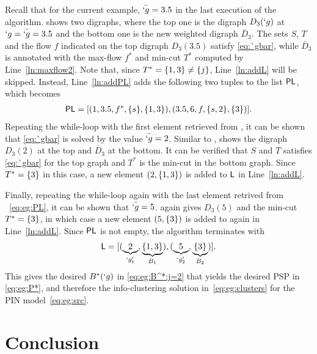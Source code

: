 \documentclass[conference,letterpaper]{IEEEtran}
\begin{document}
Recall that for the current example, $\bar {`g}=3.5$ in the last execution of the algorithm.
 shows two digraphs,
where the top one is the digraph $D_3(`g)$ at $`g=\bar{`g}=3.5$ and the bottom one is the new weighted digraph $\bar {D}_3$.
The sets $S$, $T$ and the flow $f$ indicated on the top
digraph $D_3(3.5)$ satisfy \eqref{eq:`gbar}, while $\bar {D}_3$ is annotated with the max-flow $f^*$
and min-cut $T^*$ computed by Line~\ref{ln:maxflow2}.  Note that, since $T^*=\{1,3\}\neq \{j\}$, Line~\ref{ln:addL} will be skipped. Instead, Line~\ref{ln:addPL} adds the following two tuples
to the list $\DataSty{PL}$, which becomes
\begin{align}
	\DataSty{PL}=[(1,3.5,f^*,\Set {s}, \Set {1,3}),(3.5,6,f,\Set {s,2}, \Set {3})]. \label{eq:eg:PL}
\end{align}
Repeating the while-loop with the first element retrieved from , it can be shown that \eqref{eq:`gbar} is solved by the value $\bar {`g}=2$. Similar to ,  shows the digraph $D_3(2)$ at the top and $\bar{D}_3$ at the bottom. It can be verified that $S$ and $T$ satisfies \eqref{eq:`gbar} for the top graph and $T^*$ is the min-cut in the bottom graph. Since $T^*=\{3\}$ in this case, a new element $(2,\{1,3\})$ is added to $\DataSty{L}$ in Line~\ref{ln:addL}. 

Finally, repeating the while-loop again with the last element retrived from ~\eqref{eq:eg:PL}, it can be shown that $\bar{`g}=5$.  again gives $D_3(5)$ and the min-cut $T^*=\{3\}$, in which case a new element $(5,\{3\})$ is added to  again in Line~\ref{ln:addL}. Since $\DataSty{PL}$ is not empty, the algorithm terminates with
\begin{align*}
	\DataSty{L}=[(\underbrace{2}_{`g'_1},\underbrace{\Set {1,3}}_{B_1}),(\underbrace{5}_{`g'_2},\underbrace{\Set {3}}_{B_2})].
\end{align*} 
This gives the desired $B^*(`g)$ in \eqref{eq:eg:B^*:j=2} that yields the desired PSP in \eqref{eq:eg:P*}, and therefore the info-clustering solution in~\eqref{eq:eg:clusters} for the PIN model~\eqref{eq:eg:src}.

\section{Conclusion}
\label{sec:conclusion}
\end{document}
